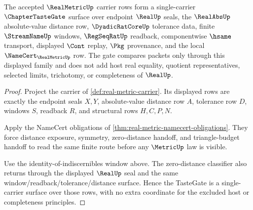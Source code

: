 \begin{theorem}
\label{thm:real-metric-taste-gate-scope}
The accepted $\RealMetricUp$ carrier rows form a single-carrier $\ChapterTasteGate$ surface over endpoint $\RealUp$ seals, the $\RealAbsUp$ absolute-value distance row, $\DyadicRatCoreUp$ tolerance data, finite $\StreamNameUp$ windows, $\RegSeqRatUp$ readback, componentwise $\hsame$ transport, displayed $\Cont$ replay, $\Pkg$ provenance, and the local $\NameCert_{\RealMetricUp}$ row. The gate compares packets only through this displayed family and does not add host real equality, quotient representatives, selected limits, trichotomy, or completeness of $\RealUp$.
\end{theorem}
\begin{proof}
Project the carrier of \autoref{def:real-metric-carrier}. Its displayed rows are exactly the endpoint seals $X,Y$, absolute-value distance row $A$, tolerance row $D$, windows $S$, readback $R$, and structural rows $H,C,P,N$.

Apply the NameCert obligations of \autoref{thm:real-metric-namecert-obligations}. They force distance exposure, symmetry, zero-distance handoff, and triangle-budget handoff to read the same finite route before any $\MetricUp$ law is visible.

Use the identity-of-indiscernibles window above. The zero-distance classifier also returns through the displayed $\RealUp$ seal and the same window/readback/tolerance/distance surface. Hence the TasteGate is a single-carrier surface over those rows, with no extra coordinate for the excluded host or completeness principles.
\end{proof}

\begin{closurestatus}{\RealMetricUp}
  \theoryclosure{\seedClosure}
  \formalstatus{\theoremCheckedV}
\end{closurestatus}
